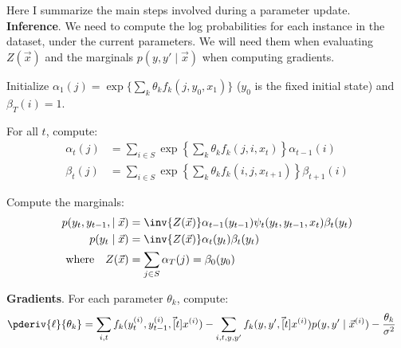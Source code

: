 \documentclass[11pt]{article}
\begin{document}
\begin{algorithm}
	Here I summarize the main steps involved during a parameter update.\\
	
	\textbf{Inference}. We need to compute the log probabilities for each instance in the dataset, under the current parameters. We will need them when evaluating $Z(\vec x)$ and the marginals $p(y, y' \mid \vec x)$ when computing gradients.
	\begin{compactenum}
		\item Initialize $\alpha_1(j) = \exp\{ \sum_k \theta_k f_k(j, y_0, x_1) \}$ ($y_0$ is the fixed initial state) and $\beta_T(i) = 1$. 
		
		\item For all $t$, compute:
		\begin{align}
		\alpha_t(j) &= \sum_{i \in S} \exp\left\{ \sum_k \theta_k f_k(j, i, x_t)\right\}  \alpha_{t - 1}(i)  \\
		\beta_t(j) &= \sum_{i \in S}   \exp\left\{ \sum_k \theta_k f_k(i, j, x_{t+1})\right\} \beta_{t+1}(i)
		\end{align}
		
		\item Compute the marginals:
		\begin{align}
		p(y_t, y_{t-1}, \mid \vec{x}) &=
		\inv{Z(\vec x)} \alpha_{t -1}(y_{t-1}) \psi_t(y_t, y_{t-1}, x_t) \beta_t(y_t)	\\
		p(y_t \mid \vec x) &= \inv{Z(\vec x)} \alpha_t(y_t) \beta_t(y_t) \\
		\text{where}\quad 
		Z(\vec x) &=  \sum_{j \in S} \alpha_T(j)  =  \beta_0(y_0) 
		\end{align}
	\end{compactenum}
	
	\textbf{Gradients}. For each parameter $\theta_k$, compute:
	\begin{align}
	\pderiv{\ell}{\theta_k} &= \sum_{i,t} f_k(y_t^{(i)}, y_{t-1}^{(i)}, \vec[t]{x}^{(i)})
	- \sum_{i,t,y,y'} f_k(y, y', \vec[t]{x}^{(i)}) p(y, y' \mid \vec{x}^{(i)})
	- \frac{\theta_k}{\sigma^2}
	\end{align}
\end{algorithm}
\end{document}
